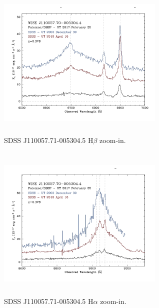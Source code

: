 \documentclass{emulateapj}
\begin{document}
\begin{figure}
  \includegraphics[width=8.00cm, height=7.50cm, trim=0.0cm 0.0cm 0.0cm 0.0cm, clip]
  {../plots/spectra/w1100m0052_hbeta.jpg}
  \centering
  \caption[]{SDSS J110057.71-005304.5 H$\beta$ zoom-in.}
 \label{fig:w1100m0052_hbeta}
\end{figure}

\begin{figure}
  \includegraphics[width=8.00cm, height=7.50cm, trim=0.0cm 0.0cm 0.0cm 0.0cm, clip]
  {../plots/spectra/w1100m0052_halpha.jpg}
  \centering
  \caption[]{SDSS J110057.71-005304.5 H$\alpha$ zoom-in.}
 \label{fig:w1100m0052_halpha}
\end{figure}



\end{document}
